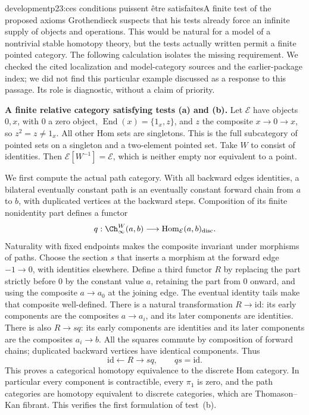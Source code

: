 \begin{dcomment}{development}{p23:ces conditions puissent être satisfaites}{A finite test of the proposed axioms}
Grothendieck suspects that his tests already force an infinite supply of objects and operations. This would be natural for a model of a nontrivial stable homotopy theory, but the tests actually written permit a finite pointed category. The following calculation isolates the missing requirement. We checked the cited localization and model-category sources and the earlier-package index; we did not find this particular example discussed as a response to this passage. Its role is diagnostic, without a claim of priority.

\textbf{A finite relative category satisfying tests (a) and (b).}\ours
Let $\mathcal E$ have objects $0,x$, with $0$ a zero object, $\operatorname{End}(x)=\{1_x,z\}$, and $z$ the composite $x\to0\to x$, so $z^2=z\ne1_x$. All other Hom sets are singletons. This is the full subcategory of pointed sets on a singleton and a two-element pointed set. Take $W$ to consist of identities. Then $\mathcal E[W^{-1}]=\mathcal E$, which is neither empty nor equivalent to a point.

We first compute the actual path category. With all backward edges identities, a bilateral eventually constant path is an eventually constant forward chain from $a$ to $b$, with duplicated vertices at the backward steps. Composition of its finite nonidentity part defines a functor
\[
 q:\Ch_\infty^W(a,b)\longrightarrow
       \operatorname{Hom}_{\mathcal E}(a,b)_{\mathrm{disc}}.
\]
Naturality with fixed endpoints makes the composite invariant under morphisms of paths. Choose the section $s$ that inserts a morphism at the forward edge $-1\to0$, with identities elsewhere. Define a third functor $R$ by replacing the part strictly before $0$ by the constant value $a$, retaining the part from $0$ onward, and using the composite $a\to a_0$ at the joining edge. The eventual identity tails make that composite well-defined. There is a natural transformation $R\to\mathrm{id}$: its early components are the composites $a\to a_i$, and its later components are identities. There is also $R\to sq$: its early components are identities and its later components are the composites $a_i\to b$. All the squares commute by composition of forward chains; duplicated backward vertices have identical components. Thus
\[
 \mathrm{id}\longleftarrow R\longrightarrow sq,
 \qquad qs=\mathrm{id}.
\]
This proves a categorical homotopy equivalence to the discrete Hom category. In particular every component is contractible, every $\pi_1$ is zero, and the path categories are homotopy equivalent to discrete categories, which are Thomason--Kan fibrant. This verifies the first formulation of test~(b).


\end{dcomment}
